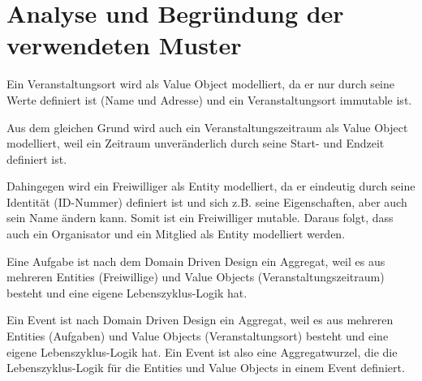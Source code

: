 \section{Analyse und Begründung der verwendeten Muster}
\label{section:analyse_und_begrundung_der_verwendeten_muster}

Ein Veranstaltungsort wird als Value Object modelliert, da er nur durch seine Werte definiert ist (Name und Adresse) und ein Veranstaltungsort immutable ist.

Aus dem gleichen Grund wird auch ein Veranstaltungszeitraum als Value Object modelliert, weil ein Zeitraum unveränderlich durch seine Start- und Endzeit definiert ist.

Dahingegen wird ein Freiwilliger als Entity modelliert, da er eindeutig durch seine Identität (ID-Nummer) definiert ist und sich z.B. seine Eigenschaften, aber auch sein Name ändern kann.
Somit ist ein Freiwilliger mutable. Daraus folgt, dass auch ein Organisator und ein Mitglied als Entity modelliert werden.

Eine Aufgabe ist nach dem Domain Driven Design ein Aggregat, weil es aus mehreren Entities (Freiwillige) und Value Objects (Veranstaltungszeitraum) besteht und eine eigene Lebenszyklus-Logik hat.

Ein Event ist nach Domain Driven Design ein Aggregat, weil es aus mehreren Entities (Aufgaben) und Value Objects (Veranstaltungsort) besteht und eine eigene Lebenszyklus-Logik hat. Ein Event ist also eine Aggregatwurzel, die die Lebenszyklus-Logik für die Entities und Value Objects in einem Event definiert.

